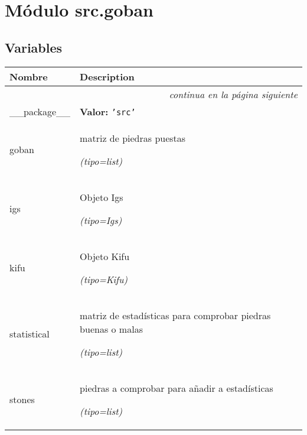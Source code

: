%
%
%


\section{Módulo src.goban}

    \label{src:goban}


  \subsection{Variables}

    \vspace{-1cm}
\hspace{\varindent}\begin{longtable}{|p{\varnamewidth}|p{\vardescrwidth}|l}
\cline{1-2}
\cline{1-2} \centering \textbf{Nombre} & \centering \textbf{Description}& \\
\cline{1-2}
\endhead\cline{1-2}\multicolumn{3}{r}{\small\textit{continua en la página siguiente}}\\\endfoot\cline{1-2}
\endlastfoot\raggedright \_\-\_\-p\-a\-c\-k\-a\-g\-e\-\_\-\_\- & \raggedright \textbf{Valor:} 
{\tt \texttt{'}\texttt{src}\texttt{'}}&\\
\cline{1-2}
\raggedright g\-o\-b\-a\-n\- & \raggedright matriz de piedras puestas

            {\it (tipo=list)}&\\
\cline{1-2}
\raggedright i\-g\-s\- & \raggedright Objeto Igs

            {\it (tipo=Igs)}&\\
\cline{1-2}
\raggedright k\-i\-f\-u\- & \raggedright Objeto Kifu

            {\it (tipo=Kifu)}&\\
\cline{1-2}
\raggedright s\-t\-a\-t\-i\-s\-t\-i\-c\-a\-l\- & \raggedright matriz de estadísticas para comprobar piedras buenas o malas

            {\it (tipo=list)}&\\
\cline{1-2}
\raggedright s\-t\-o\-n\-e\-s\- & \raggedright piedras a comprobar para añadir a estadísticas

            {\it (tipo=list)}&\\
\cline{1-2}
\end{longtable}


